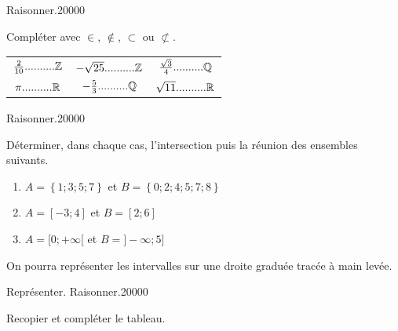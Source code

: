 \begin{pageAuto} %

\begin{ExoAutoN}{Raisonner.}{2}{0}{0}{0}{0}

Compléter avec $\in$, $\not\in$, $\subset$ ou $\not\subset$.

 \begin{tabular}{ccc}

$\frac{2}{10}..........\mathbb Z$ & $-\sqrt{25}..........\mathbb Z$ & $\frac{\sqrt{3}}{4}..........\mathbb Q$ \\ 

$\pi..........\mathbb R$  & $-\frac{5}{3}..........\mathbb Q$  &  $\sqrt{11}..........\mathbb R$ \\ 

\end{tabular} 

\end{ExoAutoN}

\begin{ExoAutoN}{Raisonner.}{2}{0}{0}{0}{0}
 

Déterminer, dans chaque cas, l'intersection puis la réunion des ensembles suivants. 

\begin{enumerate}
\item $A=\left\lbrace 1;3;5;7  \right\rbrace $ et $B=\left\lbrace 0;2;4;5;7;8  \right\rbrace $
\item $A=[-3;4]$ et $B=[2;6]$
\item $A=[0;+\infty[$ et $B=]-\infty;5]$
\end{enumerate}
On pourra représenter les intervalles sur une droite graduée tracée à main levée.
\end{ExoAutoN}

\begin{ExoAutoN}{Représenter. Raisonner.}{2}{0}{0}{0}{0}

 Recopier et compléter le tableau.


\end{ExoAutoN}
\end{pageAuto}
